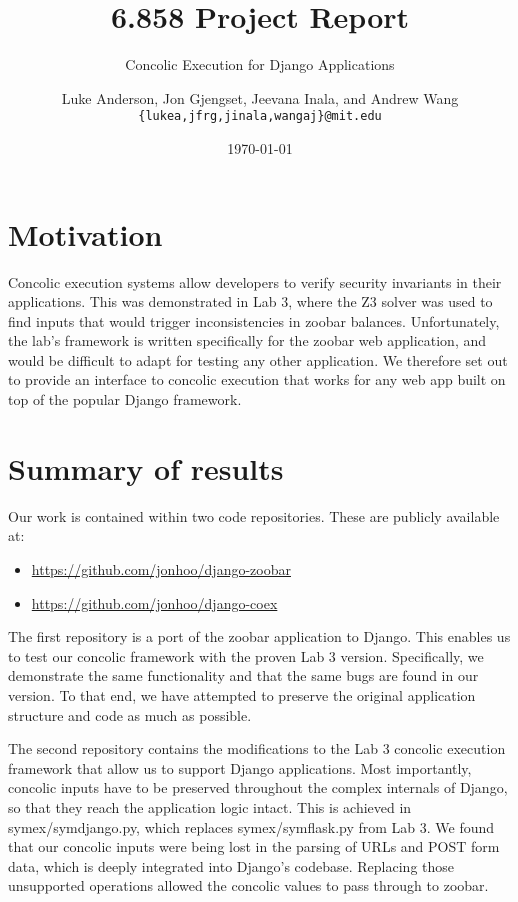 \documentclass{scrartcl}
\author{
Luke Anderson, Jon Gjengset, Jeevana Inala, and Andrew Wang \\
\texttt{\{lukea,jfrg,jinala,wangaj\}@mit.edu}
}
\title{6.858 Project Report}
\subtitle{Concolic Execution for Django Applications}
\date{\today}
\begin{document}
\maketitle


\section{Motivation}

Concolic execution systems allow developers to verify security
invariants in their applications. This was demonstrated in Lab 3,
where the Z3 solver was used to find inputs that would trigger
inconsistencies in zoobar balances. Unfortunately, the lab's
framework is written specifically for the zoobar web application, and
would be difficult to adapt for testing any other application. We
therefore set out to provide an interface to concolic execution that
works for any web app built on top of the popular Django framework.


\section{Summary of results}

Our work is contained within two code repositories. These are
publicly available at:
\begin{itemize}
\item \url{https://github.com/jonhoo/django-zoobar}
\item \url{https://github.com/jonhoo/django-coex}
\end{itemize}

The first repository is a port of the zoobar application to Django.
This enables us to test our concolic framework with the proven Lab 3
version. Specifically, we demonstrate the same functionality and that
the same bugs are found in our version. To that end, we have attempted
to preserve the original application structure and code as much as
possible.




The second repository contains the modifications to the Lab 3 concolic
execution framework that allow us to support Django applications. Most
importantly, concolic inputs have to be preserved throughout the
complex internals of Django, so that they reach the application logic
intact. This is achieved in symex/symdjango.py, which replaces
symex/symflask.py from Lab 3. We found that our concolic inputs were
being lost in the parsing of URLs and POST form data, which is deeply
integrated into Django's codebase. Replacing those unsupported
operations allowed the concolic values to pass through to zoobar.
\end{document}

